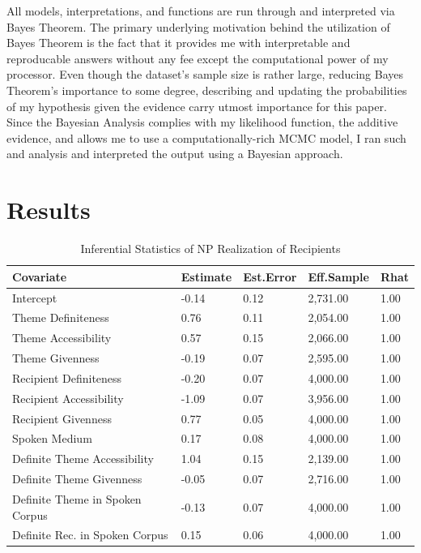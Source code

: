 \documentclass[english,floatsintext,man]{apa6}
\theoremstyle{definition}
\theoremstyle{definition}
\theoremstyle{definition}
\theoremstyle{remark}
\begin{document}
All models, interpretations, and functions are run through and
interpreted via Bayes Theorem. The primary underlying motivation behind
the utilization of Bayes Theorem is the fact that it provides me with
interpretable and reproducable answers without any fee except the
computational power of my processor. Even though the dataset's sample
size is rather large, reducing Bayes Theorem's importance to some
degree, describing and updating the probabilities of my hypothesis given
the evidence carry utmost importance for this paper. Since the Bayesian
Analysis complies with my likelihood function, the additive evidence,
and allows me to use a computationally-rich MCMC model, I ran such and
analysis and interpreted the output using a Bayesian approach.

\section{Results}\label{results}

\begin{table}[tbp]
\begin{center}
\begin{threeparttable}
\caption{\label{tab:summary}Inferential Statistics of NP Realization of Recipients}
\begin{tabular}{lllll}
\toprule
Covariate & \multicolumn{1}{c}{Estimate} & \multicolumn{1}{c}{Est.Error} & \multicolumn{1}{c}{Eff.Sample} & \multicolumn{1}{c}{Rhat}\\
\midrule
Intercept & -0.14 & 0.12 & 2,731.00 & 1.00\\
Theme Definiteness & 0.76 & 0.11 & 2,054.00 & 1.00\\
Theme Accessibility & 0.57 & 0.15 & 2,066.00 & 1.00\\
Theme Givenness & -0.19 & 0.07 & 2,595.00 & 1.00\\
Recipient Definiteness & -0.20 & 0.07 & 4,000.00 & 1.00\\
Recipient Accessibility & -1.09 & 0.07 & 3,956.00 & 1.00\\
Recipient Givenness & 0.77 & 0.05 & 4,000.00 & 1.00\\
Spoken Medium & 0.17 & 0.08 & 4,000.00 & 1.00\\
Definite Theme Accessibility & 1.04 & 0.15 & 2,139.00 & 1.00\\
Definite Theme Givenness & -0.05 & 0.07 & 2,716.00 & 1.00\\
Definite Theme in Spoken Corpus & -0.13 & 0.07 & 4,000.00 & 1.00\\
Definite Rec. in Spoken Corpus & 0.15 & 0.06 & 4,000.00 & 1.00\\
\bottomrule
\end{tabular}
\end{threeparttable}
\end{center}
\end{table}
\end{document}
